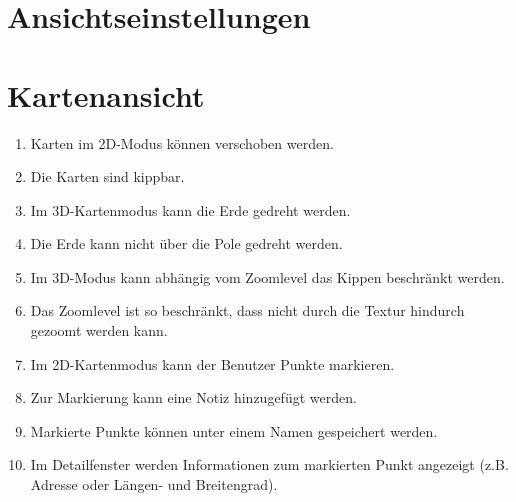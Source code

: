 \documentclass[10pt]{scrreprt}
\newcommand{\ziel}[1]{{\fontsize{9.5}{11}\textsf{/#1/}}}
\newcommand{\ziellabel}{Z}
\newcommand{\muss}{\renewcommand{\labelenumi}{\textbf{\ziel{\ziellabel\numprint{\theenumi}0}}}}
\newcommand{\wunsch}{\renewcommand{\labelenumi}{\textbf{\ziel{\ziellabel\numprint{\theenumi}0W}}}}
\begin{document}
\section{Ansichtseinstellungen}

\section{Kartenansicht}
\begin{enumerate}[leftmargin=2.2cm,resume]
\item Karten im 2D-Modus können verschoben werden.
\item Die Karten sind kippbar.
\item Im 3D-Kartenmodus kann die Erde gedreht werden.
\item Die Erde kann nicht über die Pole gedreht werden.
\item Im 3D-Modus kann abhängig vom Zoomlevel das Kippen beschränkt werden.
\item Das Zoomlevel ist so beschränkt, dass nicht durch die Textur hindurch gezoomt werden kann.
\wunsch
\item Im 2D-Kartenmodus kann der Benutzer Punkte markieren.
\item Zur Markierung kann eine Notiz hinzugefügt werden.
\item Markierte Punkte können unter einem Namen gespeichert werden.
\muss
\item Im Detailfenster werden Informationen zum markierten Punkt angezeigt (z.B. Adresse oder Längen- und Breitengrad).
\end{enumerate}
\end{document}

